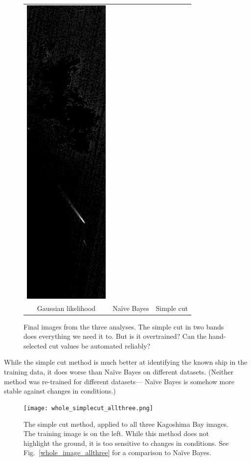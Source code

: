 \documentclass[12pt]{article}
\begin{document}
\begin{figure}
\begin{center}
\begin{tabular}{c c c}
\includegraphics[width=0.28\linewidth]{simplecut_image.png} \\
Gaussian likelihood & Na\"ive Bayes & Simple cut
\end{tabular}
\end{center}
\caption{Final images from the three analyses.  The simple cut in two
  bands does everything we need it to.  But is it overtrained?  Can
  the hand-selected cut values be automated reliably? \label{simplecut_image}}
\end{figure}

\pagebreak
While the simple cut method is much better at identifying the known
ship in the training data, it does worse than Na\"ive Bayes on
different datasets.  (Neither method was re-trained for different
datasets--- Na\"ive Bayes is somehow more stable against changes in conditions.)

\begin{figure}[!b]
\begin{center}
\texttt{[image: whole\_simplecut\_allthree.png]}
\end{center}
\caption{The simple cut method, applied to all three Kagoshima Bay
  images.  The training image is on the left.  While this method does
  not highlight the ground, it is too sensitive to changes in
  conditions.  See Fig.~\ref{whole_image_allthree} for a comparison to Na\"ive Bayes. \label{whole_simplecut_allthree}}
\end{figure}
\end{document}
